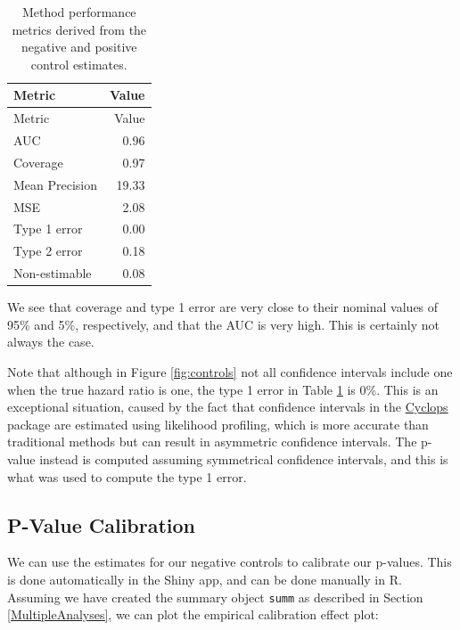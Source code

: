 \documentclass[11pt]{book}
\theoremstyle{definition}
\theoremstyle{definition}
\theoremstyle{definition}
\theoremstyle{remark}
\begin{document}
\begin{longtable}[]{@{}lr@{}}
\caption{\label{tab:exampleMetrics} Method performance metrics derived from
the negative and positive control estimates.}\tabularnewline
\toprule
Metric & Value\tabularnewline
\midrule
\endfirsthead
\toprule
Metric & Value\tabularnewline
\midrule
\endhead
AUC & 0.96\tabularnewline
Coverage & 0.97\tabularnewline
Mean Precision & 19.33\tabularnewline
MSE & 2.08\tabularnewline
Type 1 error & 0.00\tabularnewline
Type 2 error & 0.18\tabularnewline
Non-estimable & 0.08\tabularnewline
\bottomrule
\end{longtable}

We see that coverage and type 1 error are very close to their nominal
values of 95\% and 5\%, respectively, and that the AUC is very high.
This is certainly not always the case.

Note that although in Figure \ref{fig:controls} not all confidence
intervals include one when the true hazard ratio is one, the type 1
error in Table \ref{tab:exampleMetrics} is 0\%. This is an exceptional
situation, caused by the fact that confidence intervals in the
\href{https://ohdsi.github.io/Cyclops/}{Cyclops} package are estimated
using likelihood profiling, which is more accurate than traditional
methods but can result in asymmetric confidence intervals. The p-value
instead is computed assuming symmetrical confidence intervals, and this
is what was used to compute the type 1 error.

\subsection{P-Value Calibration}\label{p-value-calibration-1}

We can use the estimates for our negative controls to calibrate our
p-values. This is done automatically in the Shiny app, and can be done
manually in R. Assuming we have created the summary object \texttt{summ}
as described in Section \ref{MultipleAnalyses}, we can plot the
empirical calibration effect plot:
\end{document}
